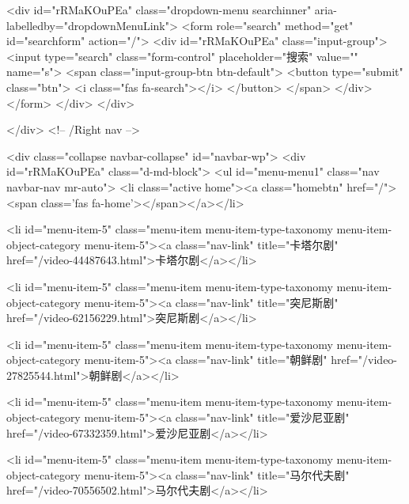                         <div id="rRMaKOuPEa"  class="dropdown-menu searchinner" aria-labelledby="dropdownMenuLink">
                            <form role="search" method="get" id="searchform" action="/">
                                <div id="rRMaKOuPEa"  class="input-group">
                                    <input type="search" class="form-control" placeholder="搜索" value="" name="s">
                                    <span class="input-group-btn btn-default">
                                        <button type="submit" class="btn"> <i class="fas fa-search"></i> </button>
                                    </span>
                                </div>
                            </form>
                        </div>
                    </div>

                </div>
                <!-- /Right nav -->


                <div class="collapse navbar-collapse" id="navbar-wp">
                    <div id="rRMaKOuPEa"  class="d-md-block">
                        <ul id="menu-menu1" class="nav navbar-nav mr-auto">
                            <li class="active home"><a class="homebtn" href="/"><span class='fas fa-home'></span></a></li>
                            
                            <li id="menu-item-5" class="menu-item menu-item-type-taxonomy menu-item-object-category menu-item-5"><a class="nav-link" title="卡塔尔剧" href="/video-44487643.html">卡塔尔剧</a></li>
                            
                            <li id="menu-item-5" class="menu-item menu-item-type-taxonomy menu-item-object-category menu-item-5"><a class="nav-link" title="突尼斯剧" href="/video-62156229.html">突尼斯剧</a></li>
                            
                            <li id="menu-item-5" class="menu-item menu-item-type-taxonomy menu-item-object-category menu-item-5"><a class="nav-link" title="朝鲜剧" href="/video-27825544.html">朝鲜剧</a></li>
                            
                            <li id="menu-item-5" class="menu-item menu-item-type-taxonomy menu-item-object-category menu-item-5"><a class="nav-link" title="爱沙尼亚剧" href="/video-67332359.html">爱沙尼亚剧</a></li>
                            
                            <li id="menu-item-5" class="menu-item menu-item-type-taxonomy menu-item-object-category menu-item-5"><a class="nav-link" title="马尔代夫剧" href="/video-70556502.html">马尔代夫剧</a></li>
                            
